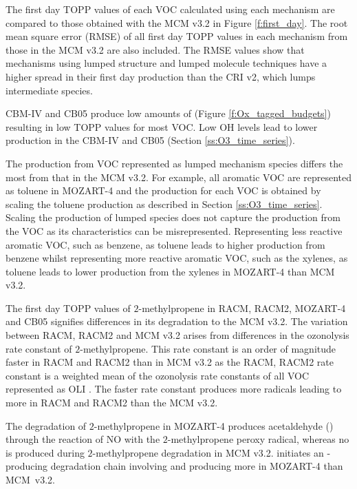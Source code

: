 The first day TOPP values of each VOC calculated using each mechanism are compared to those obtained with the MCM v3.{2} in Figure \ref{f:first_day}.
The root mean square error (RMSE) of all first day TOPP values in each mechanism from those in the MCM v3.2 are also included.
The RMSE values show that mechanisms using lumped structure and lumped molecule techniques have a higher spread in their first day  production than the CRI v2, which lumps intermediate species.

CBM-IV and CB05 produce low amounts of  (Figure \ref{f:Ox_tagged_budgets}) resulting in low TOPP values for most VOC.
Low OH levels lead to lower  production in the CBM-IV and CB05 (Section \ref{ss:O3_time_series}).

The  production from VOC represented as lumped mechanism species differs the most from that in the MCM v3.2.
For example, all aromatic VOC are represented as toluene in MOZART-4 and the  production for each VOC is obtained by scaling the toluene  production as described in Section \ref{ss:O3_time_series}.
Scaling the  production of lumped species does not capture the  production from the VOC as its characteristics can be misrepresented.
Representing less reactive aromatic VOC, such as benzene, as toluene leads to higher  production from benzene whilst representing more reactive aromatic VOC, such as the xylenes, as toluene leads to lower  production from the xylenes in MOZART-4 than MCM v3.2.

The first day TOPP values of $2$-methylpropene in RACM, RACM2, MOZART-4 and CB05 signifies differences in its degradation to the MCM v3.2. 
The variation between RACM, RACM2 and MCM v3.2 arises from differences in the ozonolysis rate constant of $2$-methylpropene.
This rate constant is an order of magnitude faster in RACM and RACM2 than in MCM v3.2 as the RACM, RACM2 rate constant is a weighted mean of the ozonolysis rate constants of all VOC represented as OLI \citep{Stockwell:1997, Goliff:2013}.
The faster rate constant produces more radicals leading to more  in RACM and RACM2 than the MCM v3.2.

The degradation of $2$-methylpropene in MOZART-4 produces acetaldehyde () through the reaction of NO with the $2$-methylpropene peroxy radical, whereas no  is produced during $2$-methylpropene degradation in MCM v3.2.
 initiates an -producing degradation chain involving  and  producing more  in MOZART-4 than \mbox{MCM v3.2}.

